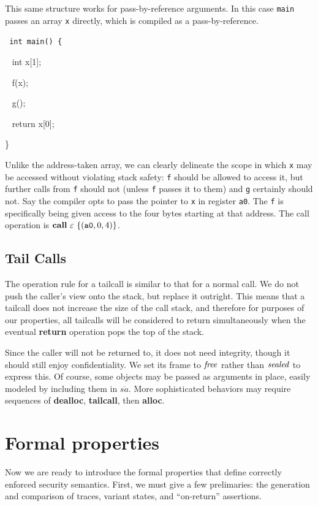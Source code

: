 \documentclass[10pt,conference]{ieeetran}%
\theoremstyle{definition}
\begin{document}
This same structure works for pass-by-reference arguments. In this case {\tt main}
passes an array {\tt x} directly, which is compiled as a pass-by-reference.

{\tt
  int main() \{

  ~ int x[1];

  ~ f(x);

  ~ g();

  ~ return x[0];

  \}
}

Unlike the address-taken array, we can clearly delineate the scope in which {\tt x} may be
accessed without violating stack safety: {\tt f} should be allowed to access it, but further
calls from {\tt f} should not (unless {\tt f} passes it to them) and {\tt g} certainly
should not. Say the compiler opts to pass the pointer to {\tt x} in register {\tt a0}.
The {\tt f} is specifically being given access to the four bytes starting at that address.
The call operation is \(\mathbf{call} ~ \varepsilon ~ \{(\mathtt{a0},0,4)\}\).

\subsection{Tail Calls}

The operation rule for a tailcall is similar to that for a normal call.
We do not push the caller's view onto the stack,
but replace it outright. This means that a tailcall does not increase the size of
the call stack, and therefore for purposes of our properties, all tailcalls will
be considered to return simultaneously when the eventual {\bf return} operation
pops the top of the stack.

Since the caller will not be returned to, it does not need integrity, though
it should still enjoy confidentiality. We set its frame to \(\mathit{free}\) rather
than \(\mathit{sealed}\) to express this. Of course, some objects may be passed as arguments
in place, easily modeled by including them in \(\overline{sa}\). More sophisticated
behaviors may require sequences of {\bf dealloc}, {\bf tailcall}, then {\bf alloc}.

\section{Formal properties}
\label{sec:props}

Now we are ready to introduce the formal properties that define correctly enforced
security semantics. First, we must give a few prelimaries: the generation and comparison
of traces, variant states, and ``on-return'' assertions.
\end{document}
